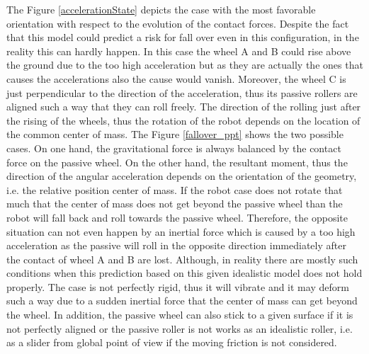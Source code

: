 \documentclass[12pt,english]{article}
\begin{document}
The Figure \ref{accelerationState} depicts the case with the most favorable orientation with respect to the evolution of the contact forces. Despite the fact that this model could predict a risk for fall over even in this configuration, in the reality this can hardly happen. In this case the wheel A and B could rise above the ground due to the too high acceleration but as they are actually the ones that causes the accelerations also the cause would vanish. Moreover, the wheel C is just perpendicular to the direction of the acceleration, thus its passive rollers are aligned such a way that they can roll freely. The direction of the rolling just after the rising of the wheels, thus the rotation of the robot depends on the location of the common center of mass. The Figure \ref{fallover_ppt} shows the two possible cases. On one hand, the gravitational force is always balanced by the contact force on the passive wheel. On the other hand, the resultant moment, thus the direction of the angular acceleration depends on the orientation of the geometry, i.e. the relative position center of mass. If the robot case does not rotate that much that the center of mass does not get beyond the passive wheel than the robot will fall back and roll towards the passive wheel. Therefore, the opposite situation can not even happen by an inertial force which is caused by a too high acceleration as the passive will roll in the opposite direction immediately after the contact of wheel A and B are lost. Although, in reality there are mostly such conditions when this prediction based on this given idealistic model does not hold properly. The case is not perfectly rigid, thus it will vibrate and it may deform such a way due to a sudden inertial force that the center of mass can get beyond the wheel. In addition, the passive wheel can also stick to a given surface if it is not perfectly aligned or the passive roller is not works as an idealistic roller, i.e. as a slider from global point of view if the moving friction is not considered.
\end{document}
